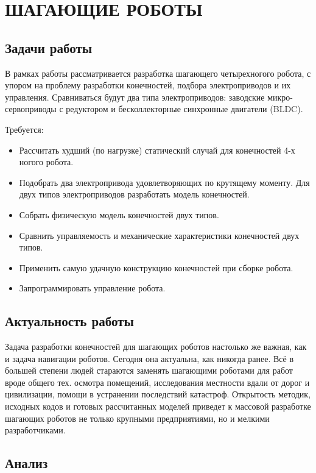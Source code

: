 \chapter{\MakeUppercase{Шагающие роботы}}

\section{Задачи работы}

В рамках работы рассматривается разработка шагающего четырехногого робота, с упором на проблему разработки конечностей, подбора электроприводов и их управления. Сравниваться будут два типа электроприводов: заводские микро-сервоприводы с редуктором и бесколлекторные синхронные двигатели (BLDC). 

Требуется:
\begin{itemize}
    \item Рассчитать худший (по нагрузке) статический случай для конечностей 4-х ногого робота.
    \item Подобрать два электропривода удовлетворяющих по крутящему моменту. Для двух типов электроприводов разработать модель конечностей.
    \item Собрать физическую модель конечностей двух типов.
    \item Сравнить управляемость и механические характеристики конечностей двух типов.
    \item Применить самую удачную конструкцию конечностей при сборке робота.
    \item Запрограммировать управление робота.
\end{itemize}

\section{Актуальность работы}

Задача разработки конечностей для шагающих роботов настолько же важная, как и задача навигации роботов. Сегодня она актуальна, как никогда ранее. Всё в большей степени людей стараются заменять шагающими роботами для работ вроде общего тех. осмотра помещений, исследования местности вдали от дорог и цивилизации, помощи в устранении последствий катастроф. Открытость методик, исходных кодов и готовых рассчитанных моделей приведет к массовой разработке шагающих роботов не только крупными предприятиями, но и мелкими разработчиками.

\section{Анализ}

